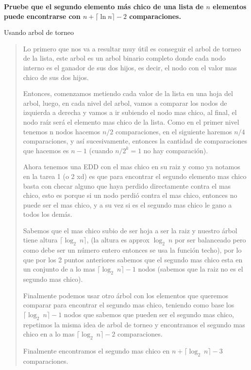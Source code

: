 \textbf{Pruebe que el segundo elemento más chico de una lista de $n$ elementos puede encontrarse con $n + \lceil \ln n \rceil - 2$ comparaciones.}\vspace{.2cm}

\textcolor{bibi}{Usando arbol de torneo}
\begin{quote}
    Lo primero que nos va a resultar muy útil es conseguir el arbol de torneo de la lista, este arbol es un arbol binario completo donde cada nodo interno es el ganador de sus dos hijos, es decir, el nodo con el valor mas chico de sus dos hijos. \vspace{.2cm}
    
    Entonces, comenzamos metiendo cada valor de la lista en una hoja del arbol, luego, en cada nivel del arbol, vamos a comparar los nodos de izquierda a derecha y vamos a ir subiendo el nodo mas chico, al final, el nodo raíz será el elemento mas chico de la lista. Como en el primer nivel tenemos n nodos hacemos $n/2$ comparaciones, en el siguiente haremos $n/4$ comparaciones, y así sucesivamente, entonces la cantidad de comparaciones que hacemos es $n - 1$ (cuando $n/2^k=1$ no hay comparación). \vspace{.2cm}

    Ahora tenemos una EDD con el mas chico en su raiz y como ya notamos en la tarea 1 (o 2 xd) es que para encontrar el segundo elemento mas chico basta con checar alguno que haya perdido directamente contra el mas chico, esto es porque si un nodo perdió contra el mas chico, entonces no puede ser el mas chico, y a su vez si es el segundo mas chico le gano a todos los demás. \vspace{.2cm}

    Sabemos que el mas chico subio de ser hoja a ser la raiz y nuestro árbol tiene altura $\lceil \log_2 \ n \rceil$, (la altura es approx $\log_2 \ n$ por ser balanceado pero como debe ser un número entero entonces se usa la función techo), por lo que por los 2 puntos anteriores sabemos que el segundo mas chico esta en un conjunto de a lo mas $\lceil \log_2 \ n \rceil-1$ nodos (sabemos que la raiz no es el segundo mas chico). \vspace{.2cm}

    Finalmente podemos usar otro árbol con los elementos que queremos comparar para encontrar el segundo mas chico, teniendo como base los $\lceil \log_2 \ n \rceil-1$ nodos que sabemos que pueden ser el segundo mas chico, repetimos la misma idea de arbol de torneo y encontramos el segundo mas chico en a lo mas $\lceil \log_2 \ n \rceil-2$ comparaciones. \vspace{.2cm}

    Finalmente encontramos el segundo mas chico en $n + \lceil \log_2 \ n \rceil - 3$ comparaciones.
\end{quote}

\newpage